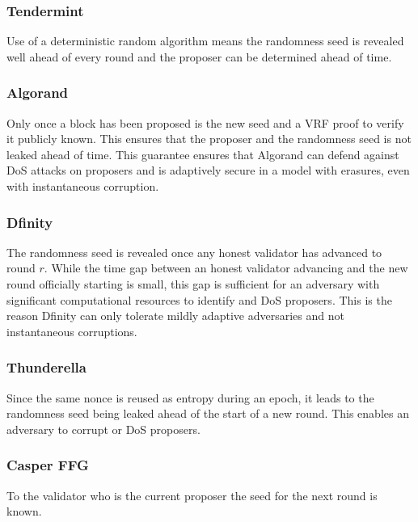 \documentclass[10pt,journal,compsoc]{IEEEtran}
\begin{document}
\subsubsection{Tendermint}
Use of a deterministic random algorithm means the randomness seed is revealed well ahead of every round and the proposer can be determined ahead of time. 

\subsubsection{Algorand}
Only once a block has been proposed is the new seed and a VRF proof to verify it publicly known. This ensures that the proposer and the randomness seed is not leaked ahead of time. This guarantee ensures that Algorand can defend against DoS attacks on proposers and is adaptively secure in a model with erasures, even with instantaneous corruption.
\subsubsection{Dfinity} 
The randomness seed is revealed once any honest validator has advanced to round $r$. While the time gap between an honest validator advancing and the new round officially starting is small, this gap is sufficient for an adversary with significant computational resources to identify and DoS proposers. This is the reason Dfinity can only tolerate mildly adaptive adversaries and not instantaneous corruptions.
\subsubsection{Thunderella}
Since the same nonce is reused as entropy during an epoch, it leads to the randomness seed being leaked ahead of the start of a new round. This enables an adversary to corrupt or DoS proposers. 
\subsubsection{Casper FFG}
To the validator who is the current proposer the seed for the next round is known.
\end{document}
